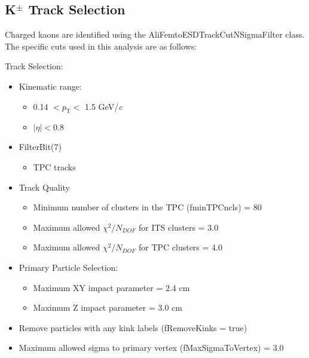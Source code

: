 \documentclass[../AnalysisNoteJBuxton.tex]{subfiles}
\begin{document}
\subsection{\texorpdfstring{K$^{\pm}$}{TEXT} Track Selection}
\label{KchTrackSelection}

Charged kaons are identified using the AliFemtoESDTrackCutNSigmaFilter class.  The specific cuts used in this analysis are as follows:

 Track Selection:
 \begin{itemize}
  \itemsep0em
  \item Kinematic range:
  \begin{itemize}
   \itemsep0em
   \item 0.14 $< p_{\mathrm{T}} <$ 1.5 GeV/\textit{c}
   \item $|\eta| < 0.8$
  \end{itemize}
  \item FilterBit(7)
  \begin{itemize}
   \item TPC tracks
  \end{itemize}
  \item Track Quality
  \begin{itemize}
   \item Minimum number of clusters in the TPC (fminTPCncls) = 80
   \item Maximum allowed $\chi^{2}/N_{DOF}$ for ITS clusters = 3.0
   \item Maximum allowed $\chi^{2}/N_{DOF}$ for TPC clusters = 4.0 
  \end{itemize}
  \item Primary Particle Selection:
  \begin{itemize} 
   \item Maximum XY impact parameter = 2.4 cm
   \item Maximum Z impact parameter = 3.0 cm
  \end{itemize} 
  \item Remove particles with any kink labels (fRemoveKinks = true)
  \item Maximum allowed sigma to primary vertex (fMaxSigmaToVertex) = 3.0
 \end{itemize} 
 
\end{document}

